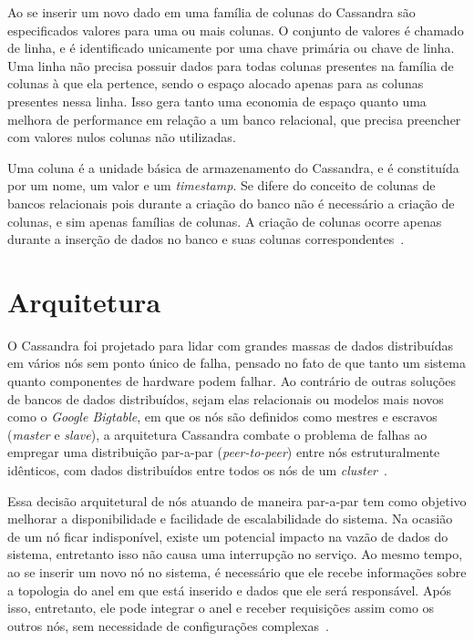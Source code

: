 Ao se inserir um novo dado em uma família de colunas do Cassandra são especificados valores para uma ou mais colunas. O conjunto de valores é chamado de linha, e é identificado unicamente por uma chave primária ou chave de linha. Uma linha não precisa possuir dados para todas colunas presentes na família de colunas à que ela pertence, sendo o espaço alocado apenas para as colunas presentes nessa linha. Isso gera tanto uma economia de espaço quanto uma melhora de performance em relação a um banco relacional, que precisa preencher com valores nulos colunas não utilizadas.

Uma coluna é a unidade básica de armazenamento do Cassandra, e é constituída por um nome, um valor e um \emph{timestamp}. Se difere do conceito de colunas de bancos relacionais pois durante a criação do banco não é necessário a criação de colunas, e sim apenas famílias de colunas. A criação de colunas ocorre apenas durante a inserção de dados no banco e suas colunas correspondentes~\cite{cassandraguide}.

\section{Arquitetura}

O Cassandra foi projetado para lidar com grandes massas de dados distribuídas em vários nós sem ponto único de falha, pensado no fato de que tanto um sistema quanto componentes de hardware podem falhar.
Ao contrário de outras soluções de bancos de dados distribuídos, sejam elas relacionais ou modelos mais novos como o \emph{Google Bigtable}, em que os nós são definidos como mestres e escravos (\emph{master} e \emph{slave}), a arquitetura Cassandra combate o problema de falhas ao empregar uma distribuição par-a-par (\emph{peer-to-peer}) entre nós estruturalmente idênticos, com dados distribuídos entre todos os nós de um \emph{cluster}~\cite{cassandradocs, cassandraguide}.  

Essa decisão arquitetural de nós atuando de maneira par-a-par tem como objetivo melhorar a disponibilidade e facilidade de escalabilidade do sistema. Na ocasião de um nó ficar indisponível, existe um potencial impacto na vazão de dados do sistema, entretanto isso não causa uma interrupção no serviço. 
Ao mesmo tempo, ao se inserir um novo nó no sistema, é necessário que ele recebe informações sobre a topologia do anel em que está inserido e dados que ele será responsável. Após isso, entretanto, ele pode integrar o anel e receber requisições assim como os outros nós, sem necessidade de configurações complexas~\cite{cassandraguide}.

